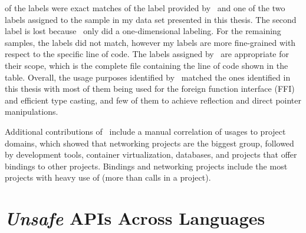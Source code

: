 

 of the labels were exact matches of the label provided by~\cite{costa2020} and one of the two labels
assigned to the sample in my data set presented in this thesis.
The second label is lost because~\cite{costa2020} only did a one-dimensional labeling.
For the remaining  samples, the labels did not match, however my labels are more fine-grained with respect
to the specific line of code.
The labels assigned by~\cite{costa2020} are appropriate for their scope, which is the complete file containing the line
of code shown in the table.
Overall, the usage purposes identified by~\cite{costa2020} matched the ones identified in this thesis with most of them
being used for the foreign function interface (\acrshort{FFI}) and efficient type casting, and few of them to achieve
reflection and direct pointer manipulations.

Additional contributions of~\cite{costa2020} include a manual correlation of \unsafe{} usages to project domains, which
showed that networking projects are the biggest group, followed by development tools, container virtualization,
databases, and projects that offer bindings to other projects.
Bindings and networking projects include the most projects with heavy use of \unsafe{} (more than  calls
in a project).



\section{\textit{Unsafe} APIs Across Languages}\label{sec:related-work:unsafe-across-languages}

